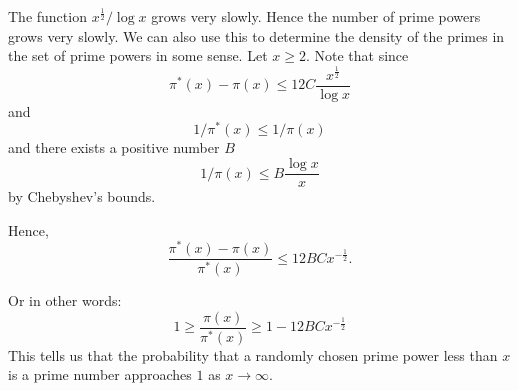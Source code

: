 \documentclass[10pt]{article}
\newenvironment{remark}[1][Remark]{\begin{trivlist}
\item[\hskip \labelsep {\bfseries #1}]}{\end{trivlist}}
\begin{document}
\begin{remark}
    The function $x^\frac{1}{2}/\log{x}$ grows very slowly. Hence
    the number of prime powers grows very slowly. We can also use
    this to determine the density of the primes in the set of prime powers in some sense.
    Let $x\geq 2$.
    Note that since
    \begin{equation*}
        \pi^*(x)-\pi(x) \leq 12C\frac{x^\frac{1}{2}}{\log{x}}
    \end{equation*}
    and
    \begin{equation*}
        1/\pi^*(x) \leq 1/\pi(x)
    \end{equation*}
    and there exists a positive number $B$
    \begin{equation*}
        1/\pi(x) \leq B\frac{\log{x}}{x}
    \end{equation*}
    by Chebyshev's bounds.
    
    Hence,
    \begin{equation*}
        \frac{\pi^*(x)-\pi(x)}{\pi^*(x)} \leq 12BCx^{-\frac{1}{2}}.
    \end{equation*}
    
    Or in other words:
    \begin{equation*}
        1\geq \frac{\pi(x)}{\pi^*(x)} \geq 1-12BCx^{-\frac{1}{2}}
    \end{equation*}
    This tells us that the probability that a randomly chosen prime
    power less than $x$ is a prime number approaches $1$ as $x\rightarrow\infty$.
    
    
\end{remark}
\end{document}
